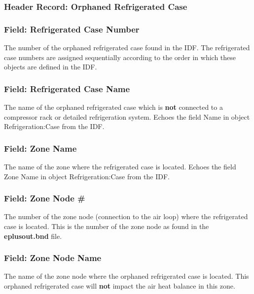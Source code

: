 \subsubsection{Header Record: Orphaned Refrigerated Case}\label{header-record-orphaned-refrigerated-case}

\subsubsection{Field: Refrigerated Case Number}\label{field-refrigerated-case-number}

The number of the orphaned refrigerated case found in the IDF. The refrigerated case numbers are assigned sequentially according to the order in which these objects are defined in the IDF.

\subsubsection{Field: Refrigerated Case Name}\label{field-refrigerated-case-name}

The name of the orphaned refrigerated case which is \textbf{not} connected to a compressor rack or detailed refrigeration system. Echoes the field Name in object Refrigeration:Case from the IDF.

\subsubsection{Field: Zone Name}\label{field-zone-name-14}

The name of the zone where the refrigerated case is located. Echoes the field Zone Name in object Refrigeration:Case from the IDF.

\subsubsection{Field: Zone Node \#}\label{field-zone-node-1}

The number of the zone node (connection to the air loop) where the refrigerated case is located. This is the number of the zone node as found in the \textbf{eplusout.bnd} file.

\subsubsection{Field: Zone Node Name}\label{field-zone-node-name-1}

The name of the zone node where the orphaned refrigerated case is located. This orphaned refrigerated case will \textbf{not} impact the air heat balance in this zone.

